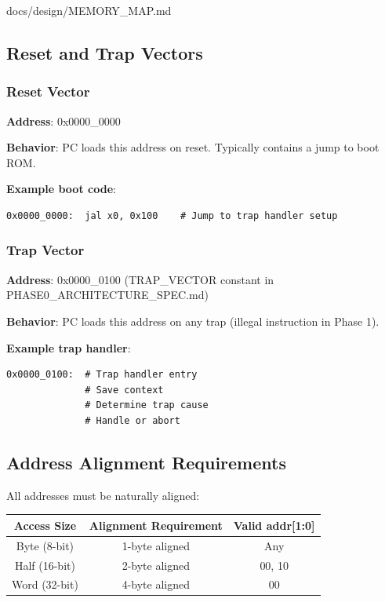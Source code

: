 \begin{relocated}{docs/design/MEMORY_MAP.md}
\subsection{Reset and Trap Vectors}\label{ds:mm:memory-map:reset-and-trap-vectors}

\subsubsection{Reset Vector}\label{ds:mm:memory-map:reset-vector}

\textbf{Address}: 0x0000\_\allowbreak{}0000

\textbf{Behavior}: PC loads this address on reset. Typically contains a
jump to boot ROM.

\textbf{Example boot code}:

\begin{lstlisting}[language={}]
0x0000_0000:  jal x0, 0x100    # Jump to trap handler setup
\end{lstlisting}

\subsubsection{Trap Vector}\label{ds:mm:memory-map:trap-vector}

\textbf{Address}: 0x0000\_\allowbreak{}0100 (TRAP\_\allowbreak{}VECTOR
constant in PHASE0\_\allowbreak{}ARCHITECTURE\_\allowbreak{}SPEC.md)

\textbf{Behavior}: PC loads this address on any trap (illegal
instruction in Phase 1).

\textbf{Example trap handler}:

\begin{lstlisting}[language={}]
0x0000_0100:  # Trap handler entry
              # Save context
              # Determine trap cause
              # Handle or abort
\end{lstlisting}

\subsection{Address Alignment Requirements}\label{ds:mm:memory-map:address-alignment-requirements}

All addresses must be naturally aligned:

{
\begin{longtable}[]{@{}ccc@{}}
\toprule\noalign{}
Access Size & Alignment Requirement & Valid addr{[}1:0{]} \\
\midrule\noalign{}
\endhead
\bottomrule\noalign{}
\endlastfoot
Byte (8-bit) & 1-byte aligned & Any \\
Half (16-bit) & 2-byte aligned & 00, 10 \\
Word (32-bit) & 4-byte aligned & 00 \\
\end{longtable}
}


\end{relocated}
